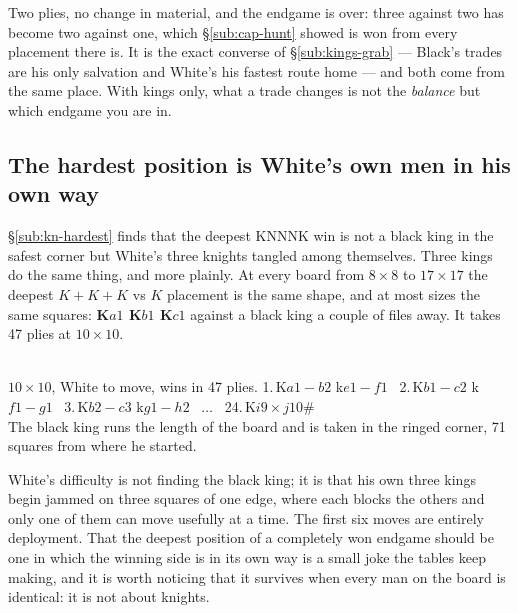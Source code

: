 \documentclass[11pt]{article}
\begin{document}
\smallskip

\noindent
Two plies, no change in material, and the endgame is over: three against two has
become two against one, which \S\ref{sub:cap-hunt} showed is won from every
placement there is. It is the exact converse of \S\ref{sub:kings-grab} ---
Black's trades are his only salvation and White's his fastest route home ---
and both come from the same place. With kings only, what a trade changes is not
the \emph{balance} but which endgame you are in.

\subsection{The hardest position is White's own men in his own way}\label{sub:kings-hardest}

\noindent
\S\ref{sub:kn-hardest} finds that the deepest KNNNK win is not a black king in
the safest corner but White's three knights tangled among themselves. Three
kings do the same thing, and more plainly. At every board from $8\times8$ to
$17\times17$ the deepest $K\!+\!K\!+\!K$ vs $K$ placement is the same shape, and
at most sizes the same squares: \textbf{K$a1$ K$b1$ K$c1$} against a black king
a couple of files away. It takes 47 plies at $10\times10$.

\begin{center}
  \\[1.5mm]
  {\scriptsize\color{inksoft}$10\times10$, White to move, wins in 47 plies.
   1.\,K$a1-b2$ k$e1-f1$ \ 2.\,K$b1-c2$ k$f1-g1$ \ 3.\,K$b2-c3$ k$g1-h2$
   \ $\ldots$ \ 24.\,K$i9\times j10$\#\\
   The black king runs the length of the board and is taken in the ringed
   corner, 71 squares from where he started.}
\end{center}

\noindent
White's difficulty is not finding the black king; it is that his own three
kings begin jammed on three squares of one edge, where each blocks the others
and only one of them can move usefully at a time. The first six moves are
entirely deployment. That the deepest position of a completely won endgame
should be one in which the winning side is in its own way is a small joke the
tables keep making, and it is worth noticing that it survives when every man on
the board is identical: it is not about knights.
\end{document}

